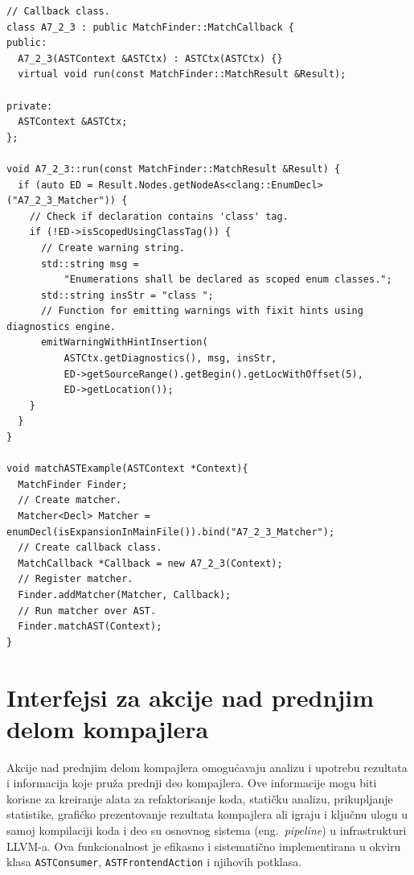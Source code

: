 \documentclass[12pt,oneside]{memoir}
\begin{document}
\begin{lstlisting}[style=customc, basicstyle=\tiny, caption={Primer upariva\v{c}a koji pronalazi sve deklaracije enumeratora koji nisu deklarisani koriste\'{c}i specifikator \texttt{class}. Ovaj primer demonstrira i upotrebu klasa \texttt{MatchFinder}, \texttt{MatchCallback} i \texttt{MatchResult}.}, label=lst:MatcherList]
// Callback class.
class A7_2_3 : public MatchFinder::MatchCallback {
public:
  A7_2_3(ASTContext &ASTCtx) : ASTCtx(ASTCtx) {}
  virtual void run(const MatchFinder::MatchResult &Result);

private:
  ASTContext &ASTCtx;
};

void A7_2_3::run(const MatchFinder::MatchResult &Result) {
  if (auto ED = Result.Nodes.getNodeAs<clang::EnumDecl>("A7_2_3_Matcher")) {
    // Check if declaration contains 'class' tag.
    if (!ED->isScopedUsingClassTag()) {
      // Create warning string.
      std::string msg =
          "Enumerations shall be declared as scoped enum classes.";
      std::string insStr = "class ";
      // Function for emitting warnings with fixit hints using diagnostics engine.
      emitWarningWithHintInsertion(
          ASTCtx.getDiagnostics(), msg, insStr,
          ED->getSourceRange().getBegin().getLocWithOffset(5),
          ED->getLocation());
    }
  }
}

void matchASTExample(ASTContext *Context){
  MatchFinder Finder;
  // Create matcher.
  Matcher<Decl> Matcher = enumDecl(isExpansionInMainFile()).bind("A7_2_3_Matcher");
  // Create callback class.
  MatchCallback *Callback = new A7_2_3(Context);
  // Register matcher.
  Finder.addMatcher(Matcher, Callback);
  // Run matcher over AST.
  Finder.matchAST(Context);
}
\end{lstlisting}


\section{Interfejsi za akcije nad prednjim delom kompajlera}

Akcije nad prednjim delom kompajlera omogu\'{c}avaju analizu i upotrebu rezultata i informacija koje pru\v{z}a prednji deo kompajlera. Ove informacije mogu biti korisne za kreiranje alata za refaktorisanje koda, stati\v{c}ku analizu, prikupljanje statistike, grafi\v{c}ko prezentovanje rezultata kompajlera ali igraju i klju\v{c}nu ulogu u samoj kompilaciji koda i deo su osnovnog sistema (eng.~\textit{pipeline}) u infrastrukturi LLVM-a.
Ova funkcionalnost je efikasno i sistemati\v{c}no implementirana u okviru klasa \texttt{ASTConsumer}, \texttt{ASTFrontendAction} i njihovih potklasa.
\end{document}
